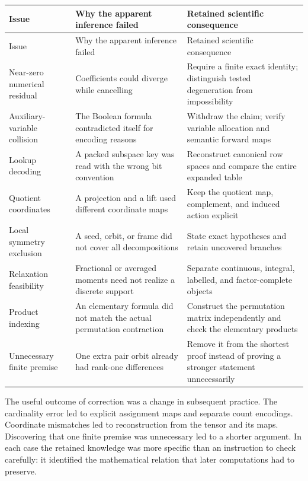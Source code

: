\begin{longtable}{@{}L{3.3cm}L{5.1cm}L{5.8cm}@{}}
\toprule
Issue & Why the apparent inference failed & Retained scientific consequence\\
\midrule
\endfirsthead
\toprule Issue & Why the apparent inference failed & Retained scientific consequence\\\midrule
\endhead
\bottomrule\endfoot
Near-zero numerical residual & Coefficients could diverge while cancelling
& Require a finite exact identity; distinguish tested degeneration from impossibility\\
Auxiliary-variable collision & The Boolean formula contradicted itself for encoding reasons
& Withdraw the claim; verify variable allocation and semantic forward maps\\
Lookup decoding & A packed subspace key was read with the wrong bit convention
& Reconstruct canonical row spaces and compare the entire expanded table\\
Quotient coordinates & A projection and a lift used different coordinate maps
& Keep the quotient map, complement, and induced action explicit\\
Local symmetry exclusion & A seed, orbit, or frame did not cover all decompositions
& State exact hypotheses and retain uncovered branches\\
Relaxation feasibility & Fractional or averaged moments need not realize a discrete support
& Separate continuous, integral, labelled, and factor-complete objects\\
Product indexing & An elementary formula did not match the actual permutation contraction
& Construct the permutation matrix independently and check the elementary products\\
Unnecessary finite premise & One extra pair orbit already had rank-one differences
& Remove it from the shortest proof instead of proving a stronger statement unnecessarily\\
\end{longtable}

The useful outcome of correction was a change in subsequent practice.
The cardinality error led to explicit assignment maps and separate
count encodings. Coordinate mismatches led to reconstruction from the
tensor and its maps. Discovering that one finite premise was unnecessary
led to a shorter argument. In each case the retained knowledge was more
specific than an instruction to check carefully: it identified the
mathematical relation that later computations had to preserve.

